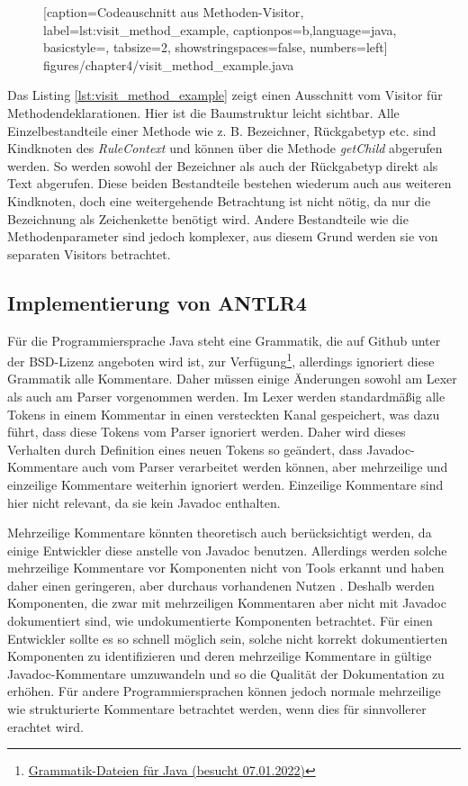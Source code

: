 		\begin{figure} [htbp]
			
			[caption={Codeauschnitt aus  Methoden-Visitor},
			label={lst:visit_method_example},
			captionpos=b,language=java, basicstyle=\footnotesize, tabsize=2, showstringspaces=false,  numbers=left]
			{figures/chapter4/visit_method_example.java}
		\end{figure}
Das Listing \ref{lst:visit_method_example} zeigt einen Ausschnitt vom Visitor für Methodendeklarationen. Hier ist die Baumstruktur leicht sichtbar. Alle Einzelbestandteile einer Methode wie z. B. Bezeichner, Rückgabetyp etc. sind Kindknoten des \textit{RuleContext} und können über die Methode \textit{getChild} abgerufen werden. So werden sowohl der Bezeichner als auch der Rückgabetyp direkt als Text abgerufen. Diese  beiden Bestandteile bestehen wiederum auch aus weiteren Kindknoten, doch eine weitergehende Betrachtung ist nicht nötig, da nur die Bezeichnung als Zeichenkette benötigt wird. Andere Bestandteile wie die Methodenparameter sind jedoch komplexer, aus diesem Grund werden sie von separaten Visitors betrachtet.

\subsection{Implementierung von ANTLR4}\label{chapter:antlr4_impl}
Für die Programmiersprache Java steht eine Grammatik, die auf Github unter der BSD-Lizenz angeboten wird ist, zur Verfügung\footnote{\href{https://github.com/antlr/grammars-v4/tree/master/java/java}{Grammatik-Dateien für Java (besucht 07.01.2022)}}, allerdings ignoriert diese Grammatik alle Kommentare. Daher müssen einige Änderungen sowohl am Lexer als auch am Parser vorgenommen werden. Im Lexer werden standardmäßig alle Tokens in einem Kommentar in einen versteckten Kanal gespeichert, was dazu führt, dass diese Tokens vom Parser ignoriert werden. Daher wird dieses Verhalten durch Definition eines neuen Tokens so geändert, dass Javadoc-Kommentare auch vom Parser verarbeitet werden können, aber mehrzeilige und einzeilige Kommentare weiterhin ignoriert werden. Einzeilige Kommentare sind hier nicht relevant, da sie kein Javadoc enthalten.

Mehrzeilige Kommentare könnten theoretisch auch berücksichtigt werden, da einige Entwickler diese anstelle von Javadoc benutzen. Allerdings werden solche mehrzeilige Kommentare vor Komponenten nicht von Tools erkannt und haben daher einen geringeren, aber durchaus vorhandenen Nutzen \cite[S. 4]{HowDocumentationEvolvesoverTime}. Deshalb werden Komponenten, die zwar mit mehrzeiligen Kommentaren aber nicht mit Javadoc dokumentiert sind, wie undokumentierte Komponenten betrachtet. Für einen Entwickler sollte es so schnell möglich sein, solche nicht korrekt dokumentierten Komponenten zu identifizieren und deren mehrzeilige Kommentare in gültige Javadoc-Kommentare umzuwandeln und so die Qualität der Dokumentation zu erhöhen. Für andere Programmiersprachen können jedoch normale mehrzeilige wie strukturierte Kommentare betrachtet werden, wenn dies für sinnvollerer erachtet wird.

